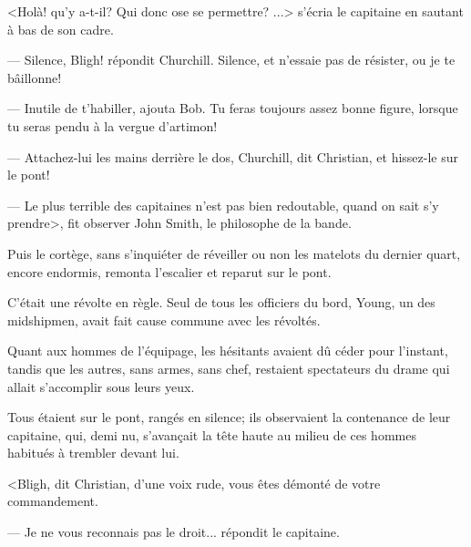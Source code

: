 <Hol\`a! qu'y a-t-il?
Qui donc ose se permettre? ...> s'\'ecria
le capitaine en sautant \`a bas de son cadre.

--- Silence, Bligh! r\'epondit Churchill. Silence,
et n'essaie pas de r\'esister, ou je te b\^aillonne!

--- Inutile de t'habiller, ajouta Bob. Tu feras toujours
assez bonne figure, lorsque tu seras pendu \`a la
vergue d'artimon!

--- Attachez-lui les mains derri\`ere le dos, Churchill,
dit Christian, et hissez-le sur le pont!

--- Le plus terrible des capitaines n'est pas bien redoutable,
quand on sait s'y prendre>, fit observer John Smith,
le philosophe de la bande.

Puis le cort\`ege, sans s'inqui\'eter de
r\'eveiller ou non les matelots du dernier quart,
encore endormis, remonta l'escalier et reparut sur le pont.

C'\'etait une r\'evolte en r\`egle.
Seul de tous les officiers du bord, Young, un des
midshipmen, avait fait cause commune avec les r\'e\-vol\-t\'es.

Quant aux hommes de l'\'equipage, les h\'esitants
avaient d\^u c\'eder pour l'instant, tandis que
les autres, sans armes, sans chef, restaient spectateurs
du drame qui allait s'accomplir sous leurs yeux.

Tous \'etaient sur le pont, rang\'es
en silence; ils observaient la contenance de leur capitaine,
qui, demi nu, s'avan\c{c}ait la t\^ete haute au milieu
de ces hommes habitu\'es \`a trembler devant lui. 

<Bligh, dit Christian, d'une voix rude, vous \^etes
d\'emont\'e de votre commandement.

--- Je ne vous reconnais pas le droit... r\'epondit le capitaine.

